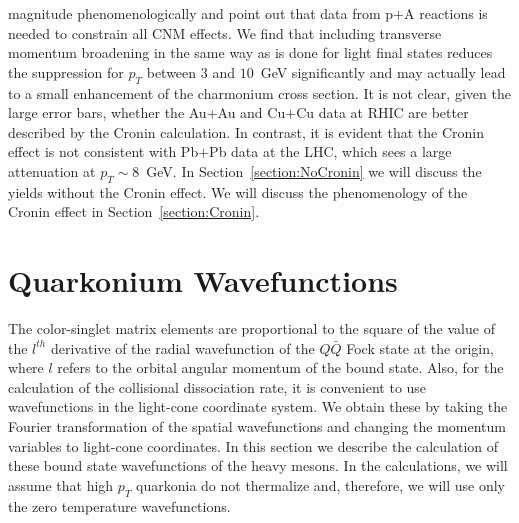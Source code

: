 \documentclass[article,showpacs,preprintnumbers,amsmath,amssymb]{revtex4}
\newcommand{\barQ}{{\bar{Q}}}
\begin{document}
\begin{enumerate}
{magnitude phenomenologically and point out that data from p$+$A reactions is needed to constrain
all CNM effects.   We find that including transverse momentum broadening in the
same way as is done for light final states reduces the suppression for $p_T$
between $3$ and $10$~GeV significantly and may actually lead to a small
enhancement of the charmonium cross section.  It is not clear, given the large
error bars, whether the Au+Au and Cu$+$Cu data at  RHIC are better described by
the Cronin calculation. In contrast, it is evident that the Cronin effect is
not consistent  with Pb$+$Pb data at the LHC, which sees a large attenuation at
$p_T\sim8$~GeV.  In Section~\ref{section:NoCronin} we will discuss the yields
without the Cronin effect. We will discuss the phenomenology of the Cronin
effect in Section~\ref{section:Cronin}.}
\end{enumerate}



\section{Quarkonium Wavefunctions~\label{section:Wavefunction}}


The color-singlet matrix elements are proportional to the square of
the value of the $l^{th}$ derivative of the radial wavefunction of the $Q\barQ$
Fock state at the origin, where $l$ refers to the orbital angular momentum of
the bound state. Also, for the calculation of the collisional dissociation
rate, it is convenient to use wavefunctions in the light-cone coordinate
system. We obtain these by taking the Fourier transformation of the spatial
wavefunctions and changing the momentum variables to light-cone coordinates.
In this section we describe the calculation of these bound state wavefunctions
of the heavy mesons. In the calculations, we will assume that high $p_T$
quarkonia do not thermalize and, therefore, we will use only the zero
temperature wavefunctions.
\end{document}
